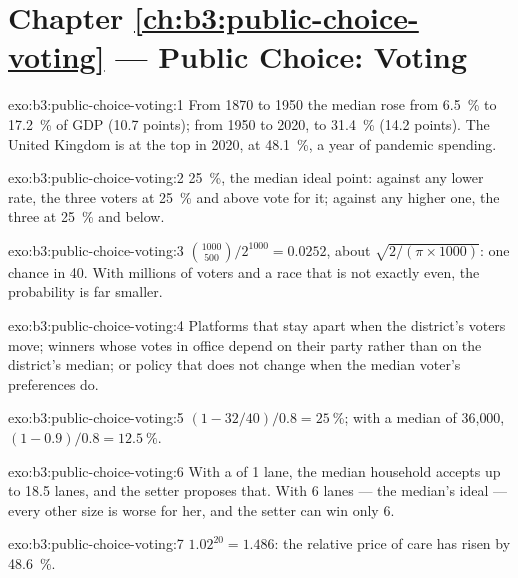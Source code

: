 \section*{Chapter \ref{ch:b3:public-choice-voting} --- Public Choice: Voting}

\begin{solution}{exo:b3:public-choice-voting:1}
From 1870 to 1950 the median rose from 6.5~\% to 17.2~\% of GDP (10.7 points); from 1950 to
2020, to 31.4~\% (14.2 points). The United Kingdom is at the top in 2020, at 48.1~\%, a year
of pandemic spending. %
\end{solution}

\begin{solution}{exo:b3:public-choice-voting:2}
25~\%, the median ideal point: against any lower rate, the three voters at 25~\% and above
vote for it; against any higher one, the three at 25~\% and below.
\end{solution}

\begin{solution}{exo:b3:public-choice-voting:3}
$\binom{1000}{500}/2^{1000} = 0.0252$, about $\sqrt{2/(\pi \times 1000)}$: one chance in 40. With millions of
voters and a race that is not exactly even, the probability is far smaller.
\end{solution}

\begin{solution}{exo:b3:public-choice-voting:4}
Platforms that stay apart when the district's voters move; winners whose votes in
office depend on their party rather than on the district's median; or policy that
does not change when the median voter's preferences do.
\end{solution}

\begin{solution}{exo:b3:public-choice-voting:5}
$(1 - 32/40)/0.8 = 25~\%$; with a median of 36{,}000, $(1 - 0.9)/0.8 = 12.5~\%$.
\end{solution}

\begin{solution}{exo:b3:public-choice-voting:6}
With a  of 1 lane, the median household accepts up to 18.5 lanes, and
the setter proposes that. With 6 lanes --- the median's ideal --- every other size is
worse for her, and the setter can win only 6. %
\end{solution}

\begin{solution}{exo:b3:public-choice-voting:7}
$1.02^{20} = 1.486$: the relative price of care has risen by 48.6~\%.
\end{solution}

